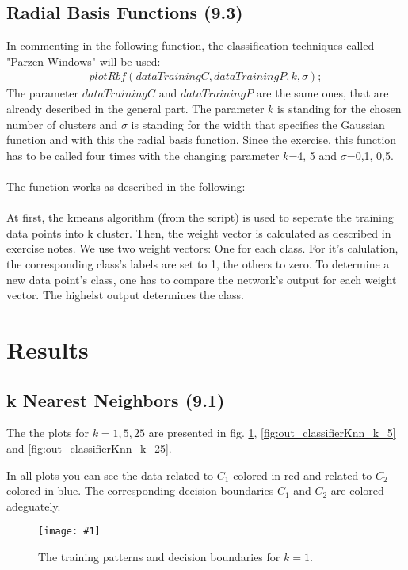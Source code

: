 \documentclass[a4paper,headings=small]{scrartcl}
\newcommand{\image}[3]{
\begin{figure}[htbp]
\centering
\texttt{[image: \#1]}
\caption{#3}
\label{fig:#1}
\end{figure}
}
\begin{document}
\subsection{Radial Basis Functions (9.3)}
In commenting in the following function, the classification techniques called "Parzen Windows" will be used:\\
\begin{align}
plotRbf(dataTrainingC, dataTrainingP, k, \sigma);
\end{align}
The parameter $dataTrainingC$ and $dataTrainingP$ are the same ones, that are already described in the general part. The parameter $k$ is standing for the chosen number of clusters and $\sigma$ is standing for the width that specifies the Gaussian function and with this the radial basis function.
Since the exercise, this function has to be called four times with the changing parameter $k$=4, 5 and $\sigma$=0,1, 0,5.\\
\\
The function works as described in the following:\\
\\
At first, the kmeans algorithm (from the script) is used to seperate the training data points into k cluster. Then, the weight vector is calculated as described in exercise notes. We use two weight vectors: One for each class. For it's calulation, the corresponding class's labels are set to 1, the others to zero. To determine a new data point's class, one has to compare the network's output for each weight vector. The highelst output determines the class.


\section{Results}

\subsection{k Nearest Neighbors (9.1)}
The the plots for $k = 1, 5, 25$ are presented in fig.
\ref{fig:out_classifierKnn_k_1},
\ref{fig:out_classifierKnn_k_5} and
\ref{fig:out_classifierKnn_k_25}.

In all plots you can see the data related to $C_1$ colored in red and related to $C_2$ colored in blue.
The corresponding decision boundaries $C_1$ and $C_2$ are colored adeguately.

\image{out_classifierKnn_k_1}{0.8}%
	{The training patterns and decision boundaries for $k = 1$.}
\end{document}
